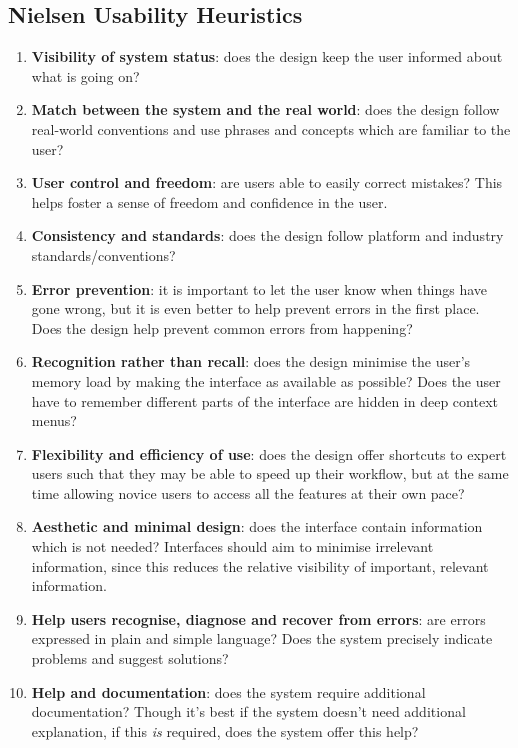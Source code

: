 \begin{appendices}
\section{Nielsen Usability Heuristics}
\label{appendix:heuristics}
\begin{enumerate}
    \item \textbf{Visibility of system status}: does the design keep the user informed about what is going on? 
    \item \textbf{Match between the system and the real world}: does the design follow real-world conventions and use phrases and concepts which are familiar to the user?
    \item \textbf{User control and freedom}: are users able to easily correct mistakes? This helps foster a sense of freedom and confidence in the user. 
    \item \textbf{Consistency and standards}: does the design follow platform and industry standards/conventions?
    \item \textbf{Error prevention}: it is important to let the user know when things have gone wrong, but it is even better to help prevent errors in the first place. Does the design help prevent common errors from happening?
    \item \textbf{Recognition rather than recall}: does the design minimise the user's memory load by making the interface as available as possible? Does the user have to remember different parts of the interface are hidden in deep context menus?
    \item \textbf{Flexibility and efficiency of use}: does the design offer shortcuts to expert users such that they may be able to speed up their workflow, but at the same time allowing novice users to access all the features at their own pace?
    \item \textbf{Aesthetic and minimal design}: does the interface contain information which is not needed? Interfaces should aim to minimise irrelevant information, since this reduces the relative visibility of important, relevant information.
    \item \textbf{Help users recognise, diagnose and recover from errors}: are errors expressed in plain and simple language? Does the system precisely indicate problems and suggest solutions?
    \item \textbf{Help and documentation}: does the system require additional documentation? Though it's best if the system doesn't need additional explanation, if this \textit{is} required, does the system offer this help?
\end{enumerate}









\end{appendices}
